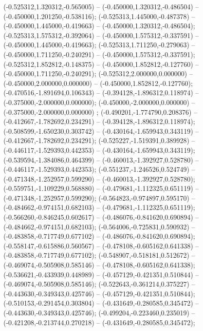  (-0.525312,1.320312,-0.565005) -- (-0.450000,1.320312,-0.486504) -- (-0.450000,1.201250,-0.538116);
 (-0.525313,1.445000,-0.487378) -- (-0.450000,1.445000,-0.419663) -- (-0.450000,1.320312,-0.486504);
 (-0.525313,1.575312,-0.392064) -- (-0.450000,1.575312,-0.337591) -- (-0.450000,1.445000,-0.419663);
 (-0.525313,1.711250,-0.279063) -- (-0.450000,1.711250,-0.240291) -- (-0.450000,1.575312,-0.337591);
 (-0.525312,1.852812,-0.148375) -- (-0.450000,1.852812,-0.127760) -- (-0.450000,1.711250,-0.240291);
 (-0.525312,2.000000,0.000000) -- (-0.450000,2.000000,0.000000) -- (-0.450000,1.852812,-0.127760);
 (-0.470516,-1.891694,0.106343) -- (-0.394128,-1.896312,0.118974) -- (-0.375000,-2.000000,0.000000);
 (-0.450000,-2.000000,0.000000) -- (-0.375000,-2.000000,0.000000) ;
 (-0.490201,-1.774790,0.208376) -- (-0.412667,-1.782692,0.234291) -- (-0.394128,-1.896312,0.118974);
 (-0.508599,-1.650230,0.303742) -- (-0.430164,-1.659943,0.343119) -- (-0.412667,-1.782692,0.234291);
 (-0.525227,-1.519391,0.389928) -- (-0.446117,-1.529393,0.442353) -- (-0.430164,-1.659943,0.343119);
 (-0.539594,-1.384086,0.464399) -- (-0.460013,-1.392927,0.528780) -- (-0.446117,-1.529393,0.442353);
 (-0.551237,-1.246526,0.524749) -- (-0.471348,-1.252957,0.599290) -- (-0.460013,-1.392927,0.528780);
 (-0.559751,-1.109229,0.568880) -- (-0.479681,-1.112325,0.651119) -- (-0.471348,-1.252957,0.599290);
 (-0.564823,-0.974897,0.595170) -- (-0.484662,-0.974151,0.682103) -- (-0.479681,-1.112325,0.651119);
 (-0.566260,-0.846245,0.602617) -- (-0.486076,-0.841620,0.690894) -- (-0.484662,-0.974151,0.682103);
 (-0.564006,-0.725831,0.590932) -- (-0.483858,-0.717749,0.677102) -- (-0.486076,-0.841620,0.690894);
 (-0.558147,-0.615886,0.560567) -- (-0.478108,-0.605162,0.641338) -- (-0.483858,-0.717749,0.677102);
 (-0.548907,-0.518181,0.512672) -- (-0.469074,-0.505908,0.585146) -- (-0.478108,-0.605162,0.641338);
 (-0.536621,-0.433939,0.448989) -- (-0.457129,-0.421351,0.510844) -- (-0.469074,-0.505908,0.585146);
 (-0.522643,-0.361214,0.375227) -- (-0.443630,-0.349343,0.425746) -- (-0.457129,-0.421351,0.510844);
 (-0.510153,-0.291454,0.303804) -- (-0.431649,-0.280585,0.345472) -- (-0.443630,-0.349343,0.425746);
 (-0.499204,-0.223460,0.235019) -- (-0.421208,-0.213744,0.270218) -- (-0.431649,-0.280585,0.345472);
